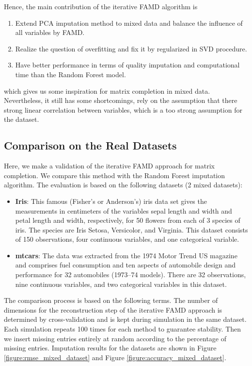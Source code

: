 \documentclass[a4paper,12pt,authoryear]{elegantpaper}
\begin{document}
    Hence, the main contribution of the iterative FAMD algorithm is
    \begin{enumerate}
        \item Extend PCA imputation method to mixed data and balance the influence of all variables by FAMD.
        \item Realize the question of overfitting and fix it by regularized in SVD procedure.
        \item Have better performance in terms of quality imputation and computational time than the Random Forest model.
    \end{enumerate}
    which gives us some inspiration for matrix completion in mixed data. Nevertheless, it still has some shortcomings, rely on the assumption that there strong linear correlation between variables, which is a too strong assumption for the dataset.

    \subsection{Comparison on the Real Datasets}

    Here, we make a validation of the iterative FAMD approach for matrix completion. We compare this method with the Random Forest imputation algorithm. The evaluation is based on the following datasets (2 mixed datasets):

    \begin{itemize}
        \item \textbf{Iris}: This famous (Fisher's or Anderson's) iris data set gives the measurements in centimeters of the variables sepal length and width and petal length and width, respectively, for 50 flowers from each of 3 species of iris. The species are Iris Setosa, Versicolor, and Virginia. This dataset consists of 150 observations, four continuous variables, and one categorical variable.
        \item \textbf{mtcars}: The data was extracted from the 1974 Motor Trend US magazine and comprises fuel consumption and ten aspects of automobile design and performance for 32 automobiles (1973–74 models). There are 32 observations, nine continuous variables, and two categorical variables in this dataset.
    \end{itemize}

    The comparison process is based on the following terms. The number of dimensions for the reconstruction step of the iterative FAMD approach is determined by cross-validation and is kept during simulation in the same dataset. Each simulation repeats 100 times for each method to guarantee stability. Then we insert missing entries entirely at random according to the percentage of missing entries.
    Imputation results for the datasets are shown in Figure \ref{figure:rmse_mixed_dataset} and Figure \ref{figure:accuracy_mixed_dataset}. 
\end{document}
